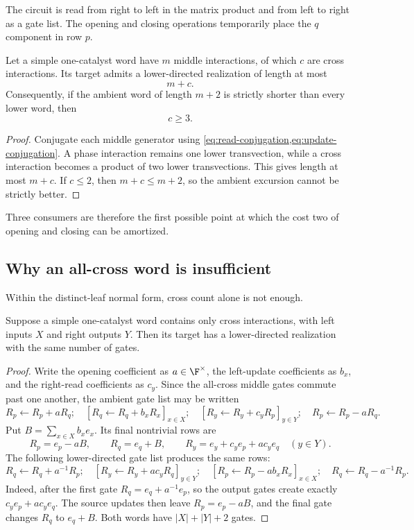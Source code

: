 The circuit is read from right to left in the matrix product and from left to right as a gate list.  The opening and closing operations temporarily place the $q$ component in row $p$.

\begin{proposition}\label{prop:cross-accounting}
Let a simple one-catalyst word have $m$ middle interactions, of which $c$ are cross interactions.  Its target admits a lower-directed realization of length at most
\[
m+c.
\]
Consequently, if the ambient word of length $m+2$ is strictly shorter than every lower word, then
\[
c\ge3.
\]
\end{proposition}

\begin{proof}
Conjugate each middle generator using \cref{eq:read-conjugation,eq:update-conjugation}.  A phase interaction remains one lower transvection, while a cross interaction becomes a product of two lower transvections.  This gives length at most $m+c$.  If $c\le2$, then $m+c\le m+2$, so the ambient excursion cannot be strictly better.
\end{proof}

Three consumers are therefore the first possible point at which the cost two of opening and closing can be amortized.

\subsection{Why an all-cross word is insufficient}

Within the distinct-leaf normal form, cross count alone is not enough.

\begin{lemma}\label{lem:all-cross-mirror}
Suppose a simple one-catalyst word contains only cross interactions, with left inputs $X$ and right outputs $Y$.  Then its target has a lower-directed realization with the same number of gates.
\end{lemma}

\begin{proof}
Write the opening coefficient as $a\in\F^\times$, the left-update coefficients as $b_x$, and the right-read coefficients as $c_y$.  Since the all-cross middle gates commute past one another, the ambient gate list may be written
\[
R_p\leftarrow R_p+aR_q;
\quad
[R_q\leftarrow R_q+b_xR_x]_{x\in X};
\quad
[R_y\leftarrow R_y+c_yR_p]_{y\in Y};
\quad
R_p\leftarrow R_p-aR_q.
\]
Put $B=\sum_{x\in X}b_xe_x$.  Its final nontrivial rows are
\[
R_p=e_p-aB,
\qquad
R_q=e_q+B,
\qquad
R_y=e_y+c_ye_p+ac_ye_q
\quad(y\in Y).
\]
The following lower-directed gate list produces the same rows:
\[
R_q\leftarrow R_q+a^{-1}R_p;
\quad
[R_y\leftarrow R_y+ac_yR_q]_{y\in Y};
\quad
[R_p\leftarrow R_p-ab_xR_x]_{x\in X};
\quad
R_q\leftarrow R_q-a^{-1}R_p.
\]
Indeed, after the first gate $R_q=e_q+a^{-1}e_p$, so the output gates create exactly $c_ye_p+ac_ye_q$.  The source updates then leave $R_p=e_p-aB$, and the final gate changes $R_q$ to $e_q+B$.  Both words have $|X|+|Y|+2$ gates.
\end{proof}

